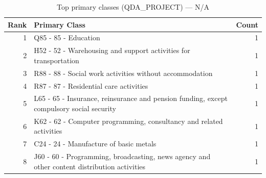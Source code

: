 \begin{table}[H]
    \centering
    \begin{tabular}{r p{10cm} r}
    \hline
    \textbf{Rank} & \textbf{Primary Class} & \textbf{Count} \\
    \hline
    1 & Q85 - 85 - Education & 1 \\
    2 & H52 - 52 - Warehousing and support activities for transportation & 1 \\
    3 & R88 - 88 - Social work activities without accommodation & 1 \\
    4 & R87 - 87 - Residential care activities & 1 \\
    5 & L65 - 65 - Insurance, reinsurance and pension funding, except compulsory social security & 1 \\
    6 & K62 - 62 - Computer programming, consultancy and related activities & 1 \\
    7 & C24 - 24 - Manufacture of basic metals & 1 \\
    8 & J60 - 60 - Programming, broadcasting, news agency and other content distribution activities & 1 \\
    \hline
    \end{tabular}
    \caption{Top primary classes (QDA\_PROJECT) --- N/A}
\end{table}

